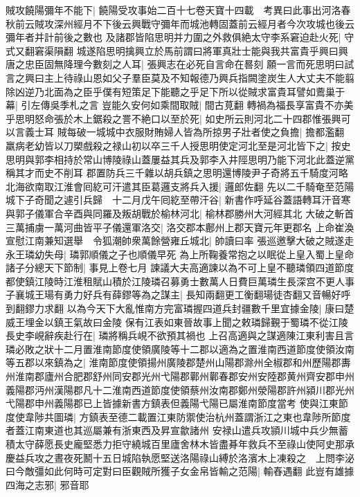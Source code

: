 賊攻饒陽彌年不能下|{
	饒陽受攻事始二百十七卷天寶十四載　考異曰此事出河洛春秋前云賊攻深州經月不下後云興戰守彌年而城池轉固蓋前云經月者今次攻城也後云彌年者并計前後之數也}
及諸郡皆陷思明并力圍之外救俱絶太守李系窘迫赴火死|{
	守式又翻窘渠隕翻}
城遂陷思明擒興立於馬前謂曰將軍真壯士能與我共富貴乎興曰興唐之忠臣固無降理今數刻之人耳|{
	張興志在必死自言命在晷刻}
願一言而死思明曰試言之興曰主上待祿山恩如父子羣臣莫及不知報德乃興兵指闕塗炭生人大丈夫不能翦除凶逆乃北面為之臣乎僕有短策足下能聽之乎足下所以從賊求富貴耳譬如鷰巢于幕|{
	引左傳吳季札之言}
豈能久安何如乘間取賊|{
	間古莧翻}
轉禍為福長享富貴不亦美乎思明怒命張於木上鋸殺之詈不絶口以至於死|{
	如史所云則河北二十四郡惟張興可以言義士耳}
賊每破一城城中衣服財賄婦人皆為所掠男子壯者使之負擔|{
	擔都濫翻}
羸病老幼皆以刀槊戲殺之禄山初以卒三千人授思明使定河北至是河北皆下之|{
	按史思明與郭李相持於常山博陵祿山蓋屢益其兵及郭李入井陘思明乃能下河北此蓋逆黨稱其才而史不削耳}
郡置防兵三千雜以胡兵鎮之思明還博陵尹子奇將五千騎度河略北海欲南取江淮會囘紇可汗遣其臣葛邏支將兵入援|{
	邏郎佐翻}
先以二千騎奄至范陽城下子奇聞之遽引兵歸　十二月戊午囘紇至帶汗谷|{
	新書作呼延谷蓋語轉耳汗音寒}
與郭子儀軍合辛酉與同羅及叛胡戰於榆林河北|{
	榆林郡勝州大河經其北}
大破之斬首三萬捕虜一萬河曲皆平子儀還軍洛交|{
	洛交郡本鄜州上郡天寶元年更郡名}
上命崔渙宣慰江南兼知選舉　令狐潮帥衆萬餘營雍丘城北|{
	帥讀曰率}
張巡邀擊大破之賊遂走　永王璘幼失母|{
	璘郭順儀之子也順儀早死}
為上所鞠養常抱之以眠從上皇入蜀上皇命諸子分總天下節制|{
	事見上卷七月}
諫議大夫高適諫以為不可上皇不聽璘領四道節度都使鎮江陵時江淮租賦山積於江陵璘召募勇士數萬人日費巨萬璘生長深宫不更人事子襄城王瑒有勇力好兵有薛鏐等為之謀主|{
	長知兩翻更工衡翻瑒徒杏翻又音暢好呼到翻鏐力求翻}
以為今天下大亂惟南方完富璘握四道兵封疆數千里宜據金陵|{
	康曰楚威王埋金以鎮王氣故曰金陵}
保有江表如東晉故事上聞之敕璘歸覲于蜀璘不從江陵長史李峴辭疾赴行在|{
	璘將稱兵峴不欲預其禍也}
上召高適與之謀適陳江東利害且言璘必敗之狀十二月置淮南節度使領廣陵等十二郡以適為之置淮南西道節度使領汝南等五郡以來鎮為之|{
	淮南節度使領揚州廣陵郡楚州山陽郡滁州全椒郡和州歷陽郡夀州淮南郡廬州合肥郡舒州同安郡光州弋陽郡鄿州鄿春郡安州安陸郡黄州齊安郡申州義陽郡沔州漢陽郡凡十二淮南西道節度使領蔡州汝南郡鄭州滎陽郡許州潁川郡光州弋陽郡申州義陽郡已上皆據新書方鎮表但義陽弋陽已屬淮南節度當考}
使與江東節度使韋陟共圖璘|{
	方鎮表至德二載置江東防禦使治杭州蓋謂浙江之東也韋陟所節度者蓋江南東道也其巡屬兼有浙東西及昇宣歙諸州}
安禄山遣兵攻頴川城中兵少無蓄積太守薛愿長史龐堅悉力拒守繞城百里廬舍林木皆盡朞年救兵不至祿山使阿史那承慶益兵攻之晝夜死鬭十五日城陷執愿堅送洛陽祿山縛於洛濱木上凍殺之　上問李泌曰今敵彊如此何時可定對曰臣觀賊所獲子女金帛皆輸之范陽|{
	輸舂遇翻}
此豈有雄據四海之志邪|{
	邪音耶}

